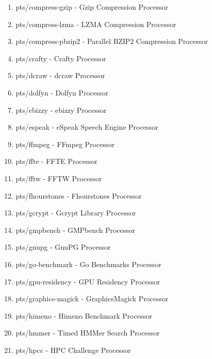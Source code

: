\documentclass[french]{article}
\begin{document}
\begin{enumerate}
\item pts/compress-gzip              - Gzip Compression                    Processor
\item pts/compress-lzma              - LZMA Compression                    Processor
\item pts/compress-pbzip2            - Parallel BZIP2 Compression          Processor
\item pts/crafty                     - Crafty                              Processor
\item pts/dcraw                      - dcraw                               Processor
\item pts/dolfyn                     - Dolfyn                              Processor
\item pts/ebizzy                     - ebizzy                              Processor
\item pts/espeak                     - eSpeak Speech Engine                Processor
\item pts/ffmpeg                     - FFmpeg                              Processor
\item pts/ffte                       - FFTE                                Processor
\item pts/fftw                       - FFTW                                Processor
\item pts/fhourstones                - Fhourstones                         Processor
\item pts/gcrypt                     - Gcrypt Library                      Processor
\item pts/gmpbench                   - GMPbench                            Processor
\item pts/gnupg                      - GnuPG                               Processor
\item pts/go-benchmark               - Go Benchmarks                       Processor
\item pts/gpu-residency              - GPU Residency                       Processor
\item pts/graphics-magick            - GraphicsMagick                      Processor
\item pts/himeno                     - Himeno Benchmark                    Processor
\item pts/hmmer                      - Timed HMMer Search                  Processor
\item pts/hpcc                       - HPC Challenge                       Processor

\end{enumerate}
\end{document}

